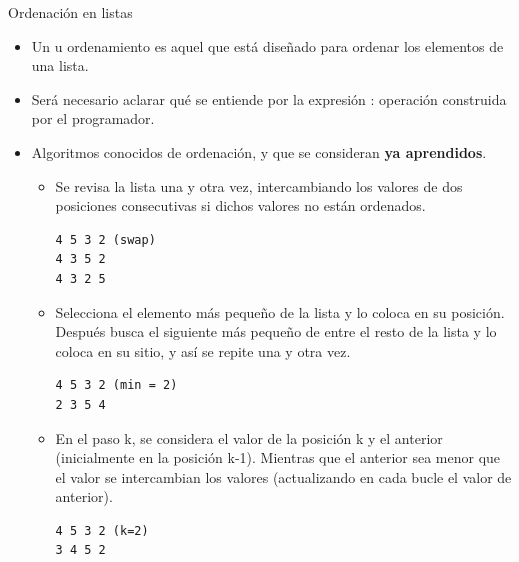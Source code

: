 \documentclass[10pt,envcountsect,spanish]{beamer}
\begin{document}
\begin{frame}[fragile]{Ordenación en listas}

\begin{itemize}
\item Un  u ordenamiento es aquel que está diseñado para ordenar los elementos de una lista. 

\item Será necesario aclarar qué se entiende por la expresión :  operación construida por el programador.

\item Algoritmos conocidos de ordenación, y que se consideran \textbf{ya aprendidos}.

\begin{itemize}
\item {} Se revisa la lista una y otra vez, intercambiando los valores de dos posiciones consecutivas si dichos valores no están ordenados.

\begin{verbatim}
4 5 3 2 (swap)
4 3 5 2
4 3 2 5
\end{verbatim}

\item {} Selecciona el elemento más pequeño de la lista y lo coloca en su posición. Después busca el siguiente más pequeño de entre el resto de la lista y lo coloca en su sitio, y así se repite una y otra vez.


\begin{verbatim}
4 5 3 2 (min = 2)
2 3 5 4
\end{verbatim}


\item {} En el paso k, se considera el valor de la posición k y el anterior (inicialmente en la posición k-1). Mientras que el anterior sea menor que el valor se intercambian los valores (actualizando en cada bucle el valor de anterior).

\begin{verbatim}
4 5 3 2 (k=2)
3 4 5 2
\end{verbatim}

\end{itemize}


\end{itemize}

\end{frame}
\end{document}
